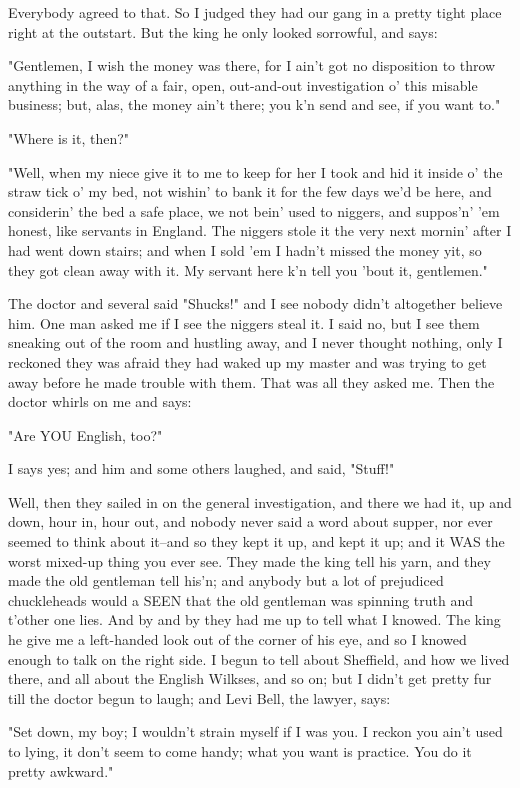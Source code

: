 Everybody agreed to that.  So I judged they had our gang in a pretty
tight place right at the outstart.  But the king he only looked
sorrowful, and says:

"Gentlemen, I wish the money was there, for I ain't got no disposition to
throw anything in the way of a fair, open, out-and-out investigation o'
this misable business; but, alas, the money ain't there; you k'n send and
see, if you want to."

"Where is it, then?"

"Well, when my niece give it to me to keep for her I took and hid it
inside o' the straw tick o' my bed, not wishin' to bank it for the few
days we'd be here, and considerin' the bed a safe place, we not bein'
used to niggers, and suppos'n' 'em honest, like servants in England.  The
niggers stole it the very next mornin' after I had went down stairs; and
when I sold 'em I hadn't missed the money yit, so they got clean away
with it.  My servant here k'n tell you 'bout it, gentlemen."

The doctor and several said "Shucks!" and I see nobody didn't altogether
believe him.  One man asked me if I see the niggers steal it.  I said no,
but I see them sneaking out of the room and hustling away, and I never
thought nothing, only I reckoned they was afraid they had waked up my
master and was trying to get away before he made trouble with them.  That
was all they asked me.  Then the doctor whirls on me and says:

"Are YOU English, too?"

I says yes; and him and some others laughed, and said, "Stuff!"

Well, then they sailed in on the general investigation, and there we had
it, up and down, hour in, hour out, and nobody never said a word about
supper, nor ever seemed to think about it--and so they kept it up, and
kept it up; and it WAS the worst mixed-up thing you ever see.  They made
the king tell his yarn, and they made the old gentleman tell his'n; and
anybody but a lot of prejudiced chuckleheads would a SEEN that the old
gentleman was spinning truth and t'other one lies.  And by and by they
had me up to tell what I knowed.  The king he give me a left-handed look
out of the corner of his eye, and so I knowed enough to talk on the right
side.  I begun to tell about Sheffield, and how we lived there, and all
about the English Wilkses, and so on; but I didn't get pretty fur till
the doctor begun to laugh; and Levi Bell, the lawyer, says:

"Set down, my boy; I wouldn't strain myself if I was you.  I reckon you
ain't used to lying, it don't seem to come handy; what you want is
practice.  You do it pretty awkward."

